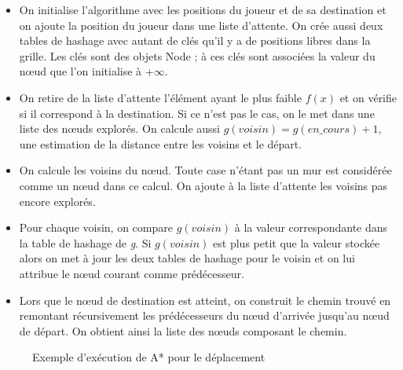 \documentclass[a4paper,12pt]{article} %
\begin{document}
\begin{itemize}
\item On initialise l'algorithme avec les positions du joueur et de sa destination et on ajoute la position du joueur dans une liste d'attente. On crée aussi deux tables de hashage avec autant de clés qu'il y a de positions libres dans la grille. Les clés sont des objets Node ; à ces clés sont associées la valeur du nœud que l'on initialise à +$\infty$.
\item On retire de la liste d'attente l'élément ayant le plus faible $f(x)$ et on vérifie si il correspond à la destination. Si ce n'est pas le cas, on le met dans une liste des nœuds explorés. On calcule aussi $g(voisin)=g(en\_cours)+1$, une estimation de la distance entre les voisins et le départ.
\item On calcule les voisins du nœud. Toute case n'étant pas un mur est considérée comme un nœud dans ce calcul. On ajoute à la liste d'attente les voisins pas encore explorés.
\item Pour chaque voisin, on compare $g(voisin)$ à la valeur correspondante dans la table de hashage de \textit{g}. Si $g(voisin)$ est plus petit que la valeur stockée alors on met à jour les deux tables de hashage pour le voisin et on lui attribue le nœud courant comme prédécesseur.
\item Lors que le nœud de destination est atteint, on construit le chemin trouvé en remontant récursivement les prédécesseurs du nœud d'arrivée jusqu'au nœud de départ. On obtient ainsi la liste des nœuds composant le chemin.
\end{itemize}
  
\begin{figure}[!h]
\centering
{}
\caption{Exemple d'exécution de A* pour le déplacement}
\end{figure}
\end{document}
